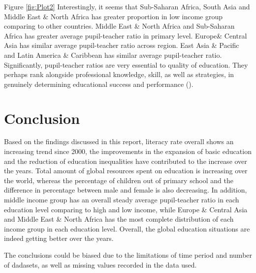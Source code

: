 \documentclass[11pt,a4paper,]{article}
\begin{document}
Figure \ref{fig:Plot2} Interestingly, it seems that Sub-Saharan Africa, South Asia and Middle East \& North Africa has greater proportion in low income group comparing to other countries. Middle East \& North Africa and Sub-Saharan Africa has greater average pupil-teacher ratio in primary level. Europe\& Central Asia has similar average pupil-teacher ratio across region. East Asia \& Pacific and Latin America \& Caribbean has similar average pupil-teacher ratio. Significantly, pupil-teacher ratios are very essential to quality of education. They perhaps rank alongside professional knowledge, skill, as well as strategies, in genuinely determining educational success and performance (\textcite{ikediashi2012pupil}).
\clearpage

\section*{Conclusion}

Based on the findings discussed in this report, literacy rate overall shows an increasing trend since 2000, the improvements in the expansion of basic education and the reduction of education inequalities have contributed to the increase over the years. Total amount of global resources spent on education is increasing over the world, whereas the percentage of children out of primary school and the difference in percentage between male and female is also decreasing. In addition, middle income group has an overall steady average pupil-teacher ratio in each education level comparing to high and low income, while Europe \& Central Asia and Middle East \& North Africa has the most complete distribution of each income group in each education level. Overall, the global education situations are indeed getting better over the years.

The conclusions could be biased due to the limitations of time period and number of dadasets, as well as missing values recorded in the data used.
\clearpage

\nocite{1}
\nocite{2}
\nocite{3}
\nocite{4}
\nocite{5}
\nocite{6}
\nocite{7}
\nocite{8}
\nocite{9}
\nocite{10}
\nocite{11}
\nocite{12}

\printbibliography
\end{document}
